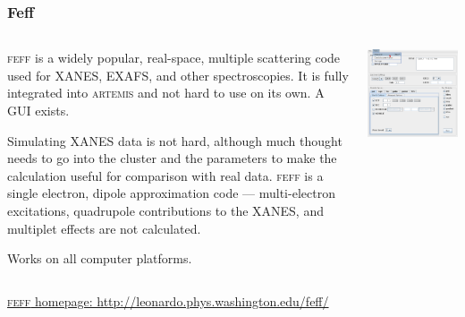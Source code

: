 \documentclass[10pt, xcolor=x11names, compress]{beamer}
\begin{document}
\begin{frame}
  \frametitle{Feff}
  
  \begin{columns}
    \begin{column}{0.55\linewidth}
      \textsc{feff} is a widely popular, real-space, multiple
      scattering code used for XANES, EXAFS, and other spectroscopies.
      It is fully integrated into \textsc{artemis} and not hard to use
      on its own.  A GUI exists.

      \medskip

      Simulating XANES data is not hard, although much thought needs
      to go into the cluster and the parameters to make the
      calculation useful for comparison with real data.  \textsc{feff}
      is a single electron, dipole approximation code ---
      multi-electron excitations, quadrupole contributions to the
      XANES, and multiplet effects are not calculated.

      \medskip

      Works on all computer platforms.
    \end{column}
    \begin{column}{0.45\linewidth}
      \includegraphics[width=0.9\linewidth]{images/jfeff.png}
    \end{column}
  \end{columns}


  \bigskip

  \href{}
  {\color{Blue4}\textsc{feff} homepage: http://leonardo.phys.washington.edu/feff/}

\end{frame}
\end{document}
